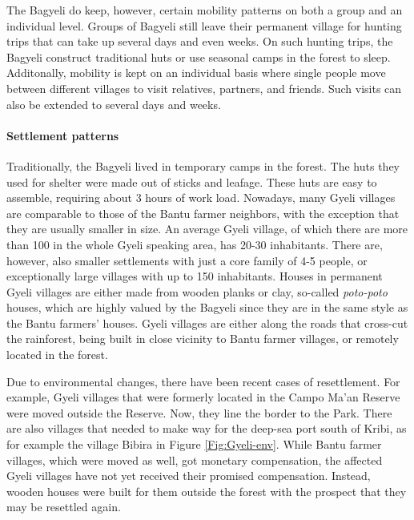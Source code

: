 The Bagyeli do keep, however, certain mobility patterns on both a group and an individual level. Groups of Bagyeli still leave their permanent village for hunting trips that can take up several days and even weeks. On such hunting trips, the Bagyeli construct traditional huts or use seasonal camps in the forest to sleep.  Additonally, mobility is kept on an individual basis where single people move between different villages to visit relatives, partners, and friends. Such visits can also be extended to several days and weeks.


\paragraph{Settlement patterns}
Traditionally, the Bagyeli lived in temporary camps in the forest. The huts they used for shelter were made out of sticks and leafage. These huts are easy to assemble, requiring about 3 hours of work load.
Nowadays, many Gyeli villages are comparable to those of the Bantu farmer neighbors, with the exception that they are usually smaller in size. An average Gyeli village, of which there are more than 100 in the whole Gyeli speaking area, has 20-30 inhabitants. There are, however, also smaller settlements with just a core family of 4-5 people, or exceptionally large villages with up to 150 inhabitants.
Houses in permanent Gyeli villages are either made from wooden planks or clay, so-called {\itshape poto-poto} houses, which are highly valued by the Bagyeli since they are in the same style as the Bantu farmers' houses.
Gyeli villages are either along the roads that cross-cut the rainforest, being built in close vicinity to Bantu farmer villages, or remotely located in the forest.

Due to environmental changes, there have been recent cases of resettlement. For example, Gyeli villages that were formerly located in the Campo Ma'an Reserve were moved outside the Reserve. Now, they line the border to the Park. There are also villages that needed to make way for the deep-sea port south of Kribi, as for example the village Bibira in Figure \ref{Fig:Gyeli-env}. While Bantu farmer villages, which were moved as well, got monetary compensation, the affected Gyeli villages have not yet received their promised compensation. Instead, wooden houses were built for them outside the forest with the prospect that they may be resettled again.



